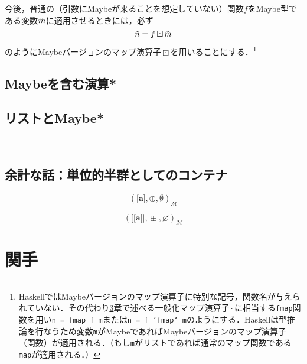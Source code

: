 \documentclass[twocolumn]{jsbook}
\def\[{[\![}
\def\]{]\!]}
\newcommand{\hsklType}[1]{\textbf{#1}}
\DeclareMathOperator{\hsklFmap}{\cdot}
\DeclareMathOperator{\hsklMaybeAppend}{\boxplus}
\DeclareMathOperator{\hsklMaybeMap}{\boxdot}
\newcommand{\hsklAppend}{\oplus}
\newcommand{\hsklEmptyList}{\emptyset}
\newcommand{\hsklNothing}{\varnothing}
\newcommand{\hsklListType}[1]{\boldsymbol{[}#1\boldsymbol{]}}
\newcommand{\hsklMaybe}[1]{\Tilde{#1}}
\newcommand{\hsklMaybeType}[1]{\boldsymbol{\[}#1\boldsymbol{\]}}
\newcommand{\mathMonoid}[3]{(#1,#2,#3)_\mathcal{M}}
\newcommand{\code}[1]{\texttt{#1}}
\newcommand{\typename}[1]{\mathbf{#1}}
\newcommand{\typeconstructor}[2]{\mathop{#1}\,#2}
\newcommand{\typeint}{\typename{Int}}
\newcommand{\typemaybe}{\typename{Maybe}}
\newcommand{\constantnothing}{\varnothing}
\newcommand{\binarymaybefunctormap}{\boxdot}
\newcommand{\binarymaybeappend}{\boxplus}
\newcommand{\maybetype}[1]{\left\{#1\right\}}
\begin{document}
今後，普通の（引数にMaybeが来ることを想定していない）関数$f$をMaybe型である変数$\hsklMaybe{m}$に適用させるときには，必ず$$\hsklMaybe{n}=f\hsklMaybeMap\hsklMaybe{m}$$のようにMaybeバージョンのマップ演算子$\hsklMaybeMap$を用いることにする．\footnote{HaskellではMaybeバージョンのマップ演算子に特別な記号，関数名が与えられていない．その代わり\ref{ch:functor}章で述べる一般化マップ演算子$\hsklFmap$に相当する\code{fmap}関数を用い\code{n = fmap f m}または\code{n = f `fmap` m}のようにする．Haskellは型推論を行なうため変数\code{m}がMaybeであればMaybeバージョンのマップ演算子（関数）が適用される．（もし\code{m}がリストであれば通常のマップ関数である\code{map}が適用される．）}



\section{Maybeを含む演算*}

\section{リストとMaybe*}

---


\section*{余計な話：単位的半群としてのコンテナ}

$$\mathMonoid{\hsklListType{\hsklType{a}}}{\hsklAppend}{\hsklEmptyList}$$

$$\mathMonoid{\hsklMaybeType{\hsklType{a}}}{\hsklMaybeAppend}{\hsklNothing}$$





\chapter{関手}
\label{ch:functor}
\end{document}
